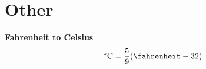 \section{Other}
\textbf{Fahrenheit to Celsius}
\begin{equation*}
    \SI{}{\celsius} = \frac{5}{9}(\SI{}{\fahrenheit} - 32)
\end{equation*}